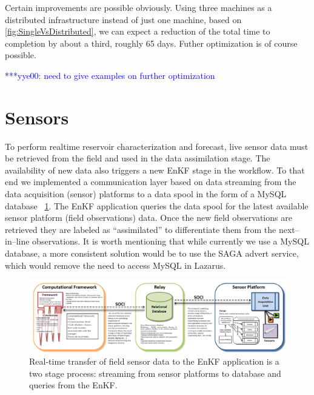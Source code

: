 \documentclass{rspublic}
\newcommand{\yyenote}[1]{ {\textcolor{blue} { ***yye00: #1 }}}
\newcommand{\yyenote}[1]{}
\begin{document}
Certain improvements are possible obviously. Using three machines as a distributed infrastructure instead of just one machine, based on \ref{fig:SingleVsDistributed}, we can expect a reduction of the total time to completion by about a third, roughly 65 days. Futher optimization is of course possible.

\yyenote{need to give examples on further optimization}	


\section{Sensors}


To perform realtime reservoir characterization and forecast, live sensor data must be retrieved from the field and used in the data assimilation stage. The availability of new data also triggers a new EnKF stage in the workflow. To that end we implemented a communication layer based on data streaming from the data acquisition (sensor) platforms to a data spool in the form of a MySQL database ~\ref{fig:SensorRelay}. The EnKF application queries the data spool for the latest available sensor platform (field observations) data. Once the new field observations are retrieved they are labeled as ``assimilated'' to differentiate them from the next--in--line observations. It is worth mentioning that while currently we use a MySQL database, a more consistent solution would be to use the SAGA advert service, which would remove the need to access MySQL in Lazarus.



\begin{figure}
\begin{center}
\includegraphics[scale=0.35]{./figures/SensorRelay.png}
\end{center}
\caption[Sensors to Simulations data flow]{Real-time transfer of field sensor data to the EnKF application is a two stage process: streaming from sensor platforms to database and queries from the EnKF.}
\label{fig:SensorRelay}
\end{figure}
\end{document}

